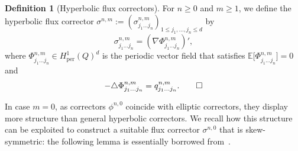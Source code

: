 \documentclass[10pt]{amsart}
\theoremstyle{plain}
\theoremstyle{definition}
\newtheorem{defin0}[theor0]{Definition}
\newenvironment{defin}
{\renewcommand{\qedsymbol}{$\lozenge$}\pushQED{\qed}\begin{defin0}}
{\popQED\end{defin0}}
\numberwithin{equation}{section}
\newcommand{\per}{{\operatorname{per}}}
\newcommand{\expecm}[1]{\mathbb{E}\bigl[ #1 \bigr]}\let\bexpec\expecm
\begin{document}
\begin{defin}[Hyperbolic flux correctors]\label{def:cocor}
For $n\ge 0$ and $m\ge1$, we define the hyperbolic flux corrector $\sigma^{n,m}:=(\sigma^{n,m}_{j_1\ldots j_n})_{1\le j_1,\ldots,j_n\le d}$ by
\[\sigma^{n,m}_{j_1\ldots j_n}=(\nabla\Phi^{n,m}_{j_1\ldots j_n})',\]
where $\Phi^{n,m}_{j_1\ldots j_n}\in H^1_\per(Q)^d$ is the periodic vector field that satisfies
\mbox{$\expecm{\Phi_{j_1\ldots j_{n}}^{n,m}}=0$} and
\[-\triangle\Phi^{n,m}_{j_1\ldots j_{n}}=q^{n,m}_{j_1\ldots j_n}.\qedhere\]
\end{defin}

In case $m=0$, as correctors $\phi^{n,0}$ coincide with elliptic correctors, they display more structure than general hyperbolic correctors. We recall how this structure can be exploited to construct a suitable flux corrector $\sigma^{n,0}$ that is skew-symmetric: the following lemma is essentially borrowed from~\cite{DO1}.
\end{document}
